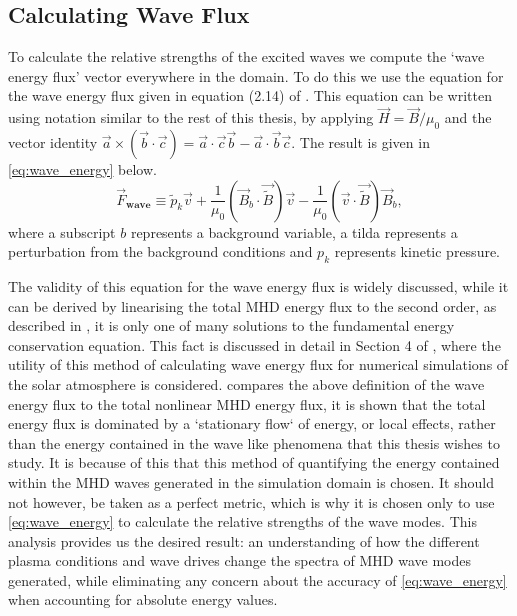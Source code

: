 \subsection{Calculating Wave Flux}\label{sec:waveflux}

To calculate the relative strengths of the excited waves we compute the `wave energy flux' vector everywhere in the domain.
To do this we use the equation for the wave energy flux given in equation (2.14) of \cite{leroy1985}.
This equation can be written using notation similar to the rest of this thesis, by applying $\vec{H} = \vec{B}/\mu_0$ and the vector identity $\vec{a} \times (\vec{b} \cdot \vec{c}) = \vec{a} \cdot \vec{c}\vec{b} - \vec{a} \cdot \vec{b}\vec{c}$.
The result is given in \cref{eq:wave_energy} below.
\begin{equation}
\vec{F}_{\textbf{wave}} \equiv \widetilde{p}_k \vec{v} + \frac{1}{\mu_0} \left(\vec{B}_b \cdot \vec{\widetilde{B}}\right) \vec{v} - \frac{1}{\mu_0}\left(\vec{v} \cdot \vec{\widetilde{B}} \right) \vec{B}_b,
\label{eq:wave_energy}
\end{equation}
where a subscript $b$ represents a background variable, a tilda represents a perturbation from the background conditions and $p_k$ represents kinetic pressure.

The validity of this equation for the wave energy flux is widely discussed, while it can be derived by linearising the total MHD energy flux to the second order, as described in \cite{leroy1985}, it is only one of many solutions to the fundamental energy conservation equation.
This fact is discussed in detail in Section 4 of \cite{bogdan2003}, where the utility of this method of calculating wave energy flux for numerical simulations of the solar atmosphere is considered.
\cite{bogdan2003} compares the above definition of the wave energy flux to the total nonlinear MHD energy flux, it is shown that the total energy flux is dominated by a `stationary flow` of energy, or local effects, rather than the energy contained in the wave like phenomena that this thesis wishes to study.
It is because of this that this method of quantifying the energy contained within the MHD waves generated in the simulation domain is chosen.
It should not however, be taken as a perfect metric, which is why it is chosen only to use \cref{eq:wave_energy} to calculate the relative strengths of the wave modes.
This analysis provides us the desired result: an understanding of how the different plasma conditions and wave drives change the spectra of MHD wave modes generated, while eliminating any concern about the accuracy of \cref{eq:wave_energy} when accounting for absolute energy values.



